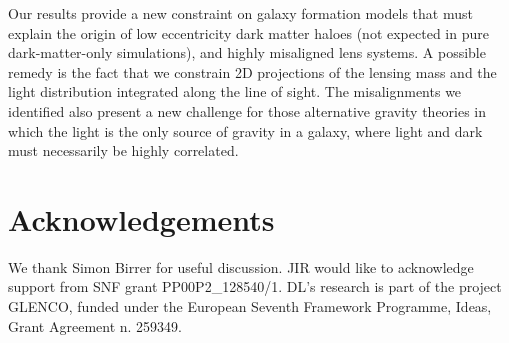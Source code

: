 \documentclass[useAMS,usenatbib]{mn2e}
\begin{document}
Our results provide a new constraint on galaxy formation models that must explain the origin of low eccentricity dark matter haloes (not expected in pure dark-matter-only simulations), and highly misaligned lens systems. A possible remedy is the fact that we constrain 2D projections of the lensing mass and the light distribution integrated along the line of sight. The misalignments we identified also present a new challenge for those alternative gravity theories in which the light is the only source of gravity in a galaxy, where light and dark must necessarily be highly correlated.


\section{Acknowledgements}\label{sec:acknowledgements}
We thank Simon Birrer for useful discussion. JIR would like to acknowledge support from SNF grant PP00P2\_128540/1. DL's research is part of the project GLENCO, funded under the European Seventh Framework Programme, Ideas, Grant Agreement n. 259349.






\appendix
\end{document}
